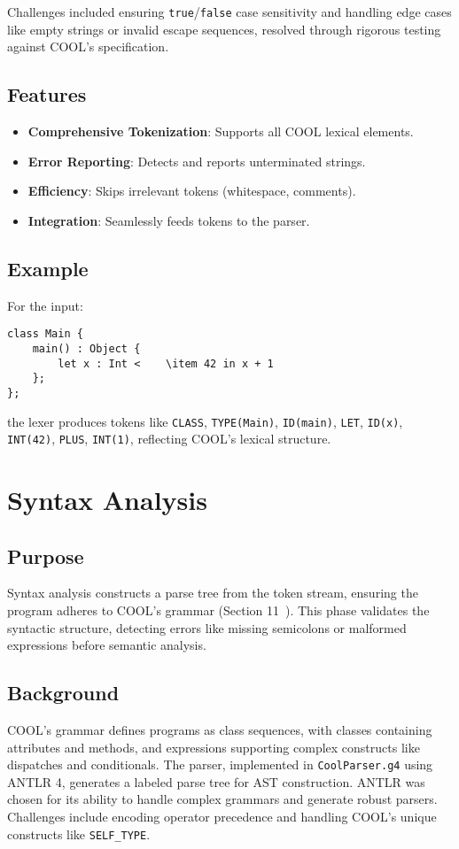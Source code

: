 \documentclass[11pt, titlepage]{article}
\begin{document}
Challenges included ensuring \texttt{true}/\texttt{false} case sensitivity and handling edge cases like empty strings or invalid escape sequences, resolved through rigorous testing against COOL's specification.

\subsection{Features}
\begin{itemize}[leftmargin=*]
    \item \textbf{Comprehensive Tokenization}: Supports all COOL lexical elements.
    \item \textbf{Error Reporting}: Detects and reports unterminated strings.
    \item \textbf{Efficiency}: Skips irrelevant tokens (whitespace, comments).
    \item \textbf{Integration}: Seamlessly feeds tokens to the parser.
\end{itemize}

\subsection{Example}
For the input:
\begin{lstlisting}
class Main {
    main() : Object {
        let x : Int <    \item 42 in x + 1
    };
};
\end{lstlisting}
the lexer produces tokens like \texttt{CLASS}, \texttt{TYPE(Main)}, \texttt{ID(main)}, \texttt{LET}, \texttt{ID(x)}, \texttt{INT(42)}, \texttt{PLUS}, \texttt{INT(1)}, reflecting COOL's lexical structure.

\section{Syntax Analysis}
\label{sec:syntax}

\subsection{Purpose}
Syntax analysis constructs a parse tree from the token stream, ensuring the program adheres to COOL's grammar (Section 11~\cite{cool_manual}). This phase validates the syntactic structure, detecting errors like missing semicolons or malformed expressions before semantic analysis.

\subsection{Background}
COOL's grammar defines programs as class sequences, with classes containing attributes and methods, and expressions supporting complex constructs like dispatches and conditionals. The parser, implemented in \texttt{CoolParser.g4} using ANTLR 4, generates a labeled parse tree for AST construction. ANTLR was chosen for its ability to handle complex grammars and generate robust parsers. Challenges include encoding operator precedence and handling COOL's unique constructs like \texttt{SELF\_TYPE}.
\end{document}
